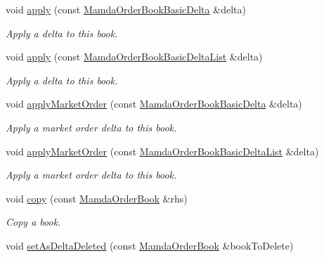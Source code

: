 \begin{CompactItemize}
void \hyperlink{classWombat_1_1MamdaOrderBook_e42ecb8f8d3eb5a0b213379515ac3805}{apply} (const \hyperlink{classWombat_1_1MamdaOrderBookBasicDelta}{Mamda\-Order\-Book\-Basic\-Delta} \&delta)
\begin{CompactList}\small\item\em Apply a delta to this book. \item\end{CompactList}\item 
void \hyperlink{classWombat_1_1MamdaOrderBook_a3925803c4f122b7b26145bffccbc39b}{apply} (const \hyperlink{classWombat_1_1MamdaOrderBookBasicDeltaList}{Mamda\-Order\-Book\-Basic\-Delta\-List} \&delta)
\begin{CompactList}\small\item\em Apply a delta to this book. \item\end{CompactList}\item 
void \hyperlink{classWombat_1_1MamdaOrderBook_da9a33dbc3e2cc7f6ac8ad5da9495d04}{apply\-Market\-Order} (const \hyperlink{classWombat_1_1MamdaOrderBookBasicDelta}{Mamda\-Order\-Book\-Basic\-Delta} \&delta)
\begin{CompactList}\small\item\em Apply a market order delta to this book. \item\end{CompactList}\item 
void \hyperlink{classWombat_1_1MamdaOrderBook_a6274446bf3f77dc34eacea2c5876a18}{apply\-Market\-Order} (const \hyperlink{classWombat_1_1MamdaOrderBookBasicDeltaList}{Mamda\-Order\-Book\-Basic\-Delta\-List} \&delta)
\begin{CompactList}\small\item\em Apply a market order delta to this book. \item\end{CompactList}\item 
void \hyperlink{classWombat_1_1MamdaOrderBook_75693551c298313eb92601da367abd59}{copy} (const \hyperlink{classWombat_1_1MamdaOrderBook}{Mamda\-Order\-Book} \&rhs)
\begin{CompactList}\small\item\em Copy a book. \item\end{CompactList}\item 
void \hyperlink{classWombat_1_1MamdaOrderBook_50f867044fee92e05d230205b444d31d}{set\-As\-Delta\-Deleted} (const \hyperlink{classWombat_1_1MamdaOrderBook}{Mamda\-Order\-Book} \&book\-To\-Delete)

\end{CompactItemize}
